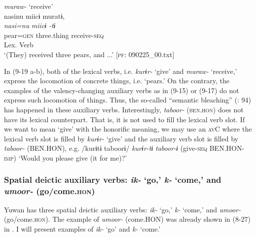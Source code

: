 \ex \textit{muraw-} ‘receive’\\
 \gllll  nasinu  miicɨ  muratɨ,\\
    \textit{nasi=nu}  \textit{miicɨ}  \textit{-tɨ}\\
    pear=\textsc{gen}  three.thing  receive-\textsc{seq}\\
        Lex. Verb\\
    \glt     ‘(They) received three pears, and ...’ [\textsc{pf}: 090225\_00.txt]
  \z
\z

In (9-19 a-b), both of the lexical verbs, i.e. \textit{kurɨr-} ‘give’ and \textit{muraw-} ‘receive,’ express the locomotion of concrete things, i.e. ‘pears.’ On the contrary, the examples of the valency-changing auxiliary verbs as in (9-15) or (9-17) do not express such locomotion of things. Thus, the so-called “semantic bleaching” (\citealt{HopperTraugott2003}: 94) has happened in these auxiliary verbs. Interestingly, \textit{taboor-} (\textsc{ben}.\textsc{hon}) does not have its lexical counterpart. That is, it is not used to fill the lexical verb slot. If we want to mean ‘give’ with the honorific meaning, we may use an \textsc{av}C where the lexical verb slot is filled by \textit{kurɨr-} ‘give’ and the auxiliary verb slot is filled by \textit{taboor-} (BEN.HON), e.g. /kurɨtɨ taboorɨ/ \textit{kurɨr-tɨ} \textit{taboor-ɨ} (give-\textsc{seq} BEN.HON-\textsc{imp}) ‘Would you please give (it for me)?’

\subsubsection{Spatial deictic auxiliary verbs: \textit{ik-} ‘go,’ \textit{k-} ‘come,’ and \textit{umoor-} (go/come.\textsc{hon})}\label{sec:9.1.1.4}

Yuwan has three spatial deictic auxiliary verbs: \textit{ik-} ‘go,’ \textit{k-} ‘come,’ and \textit{umoor-} (go/come.\textsc{hon}). The example of \textit{umoor-} (come.HON) was already shown in (8-27) in . I will present examples of \textit{ik-} ‘go’ and \textit{k-} ‘come.’

